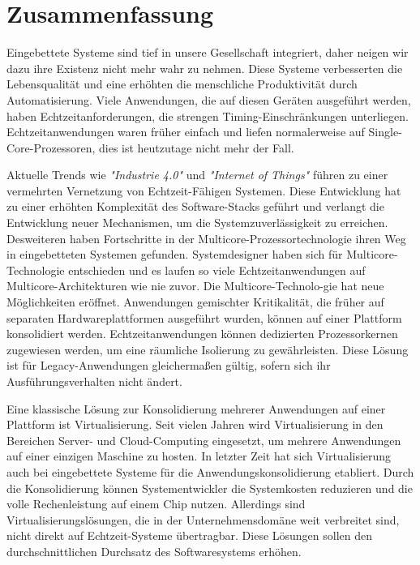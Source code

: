 \chapter*{Zusammenfassung}

Eingebettete Systeme sind tief in unsere Gesellschaft integriert, daher neigen wir dazu ihre Existenz nicht mehr wahr zu nehmen.
Diese Systeme verbesserten die Lebensqualit{\"a}t und eine erh{\"o}hten die menschliche Produktivit{\"a}t durch Automatisierung.
Viele Anwendungen, die auf diesen Ger{\"a}ten ausgef{\"u}hrt werden, haben Echtzeitanforderungen, die strengen Timing-Einschr{\"a}nkungen unterliegen.
Echtzeitanwendungen waren fr{\"u}her einfach und liefen normalerweise auf Single-Core-Prozessoren, dies ist heutzutage nicht mehr der Fall.

Aktuelle Trends wie \emph{"Industrie 4.0"} und \emph{"Internet of Things"} f{\"u}hren zu einer vermehrten Vernetzung von Echtzeit-F{\"a}higen Systemen.
Diese Entwicklung hat zu einer erh{\"o}hten Komplexit{\"a}t des Software-Stacks gef{\"u}hrt und verlangt die Entwicklung neuer
Mechanismen, um die Systemzuverl{\"a}ssigkeit zu erreichen.
Desweiteren haben Fortschritte in der Multicore-Prozessortechnologie ihren Weg in eingebetteten Systemen gefunden.
Systemdesigner haben sich f{\"u}r Multicore-Technologie entschieden und es laufen so viele Echtzeitanwendungen auf Multicore-Architekturen wie nie zuvor.
Die Multicore-Technolo-gie hat neue M{\"o}glichkeiten er{\"o}ffnet.
Anwendungen gemischter Kritikalit{\"a}t, die fr{\"u}her auf separaten Hardwareplattformen ausgef{\"u}hrt wurden, k{\"o}nnen auf einer Plattform konsolidiert werden.
Echtzeitanwendungen k{\"o}nnen dedizierten Prozessorkernen zugewiesen werden, um eine r{\"a}umliche Isolierung zu gew{\"a}hrleisten.
Diese L{\"o}sung ist f{\"u}r Legacy-Anwendungen gleicherma{\ss}en g{\"u}ltig, sofern sich ihr Ausf{\"u}hrungsverhalten nicht {\"a}ndert.

Eine klassische L{\"o}sung zur Konsolidierung mehrerer Anwendungen auf einer Plattform ist Virtualisierung.
Seit vielen Jahren wird Virtualisierung in den Bereichen Server- und Cloud-Computing eingesetzt, um mehrere Anwendungen auf einer einzigen Maschine zu hosten.
In letzter Zeit hat sich Virtualisierung auch bei eingebettete Systeme  f{\"u}r die Anwendungskonsolidierung etabliert.
Durch die Konsolidierung k{\"o}nnen Systementwickler die Systemkosten reduzieren und die volle Rechenleistung auf einem Chip nutzen.
Allerdings sind Virtualisierungsl{\"o}sungen, die in der Unternehmensdom{\"a}ne weit verbreitet sind, nicht direkt auf Echtzeit-Systeme {\"u}bertragbar.
Diese L{\"o}sungen sollen den durchschnittlichen Durchsatz des Softwaresystems erh{\"o}hen.

